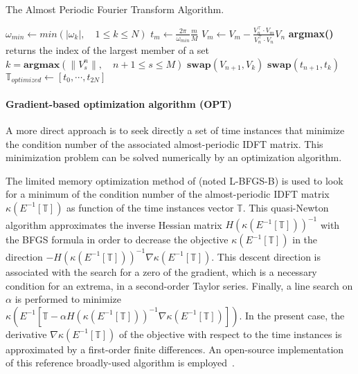 \begin{algorithm}[htb]
\caption{The Almost Periodic Fourier Transform Algorithm.}
\label{alg:algo_APFT}
\begin{algorithmic}
\STATE $\omega_{min} \leftarrow min \left( |\omega_k |,\quad 1 \leqslant k \leqslant N \right)$
    \STATE $t_m \leftarrow \displaystyle\frac{2\pi}{\omega_{min}}\frac{m}{M}$
\ENDFOR
{}
  \STATE $ V_{m} \leftarrow V_{m} - \displaystyle\frac{V_{n}^\top \cdot V_{m}}{V_{n}^\top \cdot V_{n}} V_{n}$
   \ENDFOR
   \STATE \textbf{argmax()} returns the index of the largest member of a set
   \STATE $k=\textbf{argmax} \left( \| V_s^n \|,\quad n+1\leqslant s \leqslant M\right) $
   \STATE $\textbf{swap}(V_{n+1},V_{k})$
   \STATE $\textbf{swap}(t_{n+1},t_{k})$
\ENDFOR
\STATE $\mathbb{T}_{optimized} \leftarrow [t_0, \cdots, t_{2N}]$
\end{algorithmic}
\end{algorithm}

\paragraph{Gradient-based optimization algorithm (OPT)}
A more direct approach is to seek directly a set of time instances
that minimize the condition number of the associated almost-periodic IDFT matrix. 
This minimization problem can be solved numerically by an optimization algorithm.

The limited memory optimization method of
\citet{Byrd1995} (noted L-BFGS-B) is
used to look for a minimum of the condition number of the
almost-periodic IDFT matrix $\kappa \left(E^{-1} \left[\mathbb{T} \right]
\right)$ as function of the time instances vector $\mathbb{T}$. This
quasi-Newton algorithm approximates the inverse Hessian matrix
$H(\kappa \left(E^{-1} \left[\mathbb{T} \right] \right))^{-1}$ with the
BFGS formula in order to decrease the objective $\kappa \left(E^{-1}
  \left[\mathbb{T} \right] \right)$ in the direction $-H(\kappa
\left(E^{-1} \left[\mathbb{T} \right] \right))^{-1}\nabla \kappa \left(E^{-1}
  \left[\mathbb{T} \right] \right)$.  This descent direction is
associated with the search for a zero of the gradient, which is a
necessary condition for an extrema, in a second-order Taylor series.
Finally, a line search on $\alpha$ is performed to minimize $\kappa
\left(E^{-1} \left[\mathbb{T} - \alpha H(\kappa \left(E^{-1} \left[\mathbb{T}
      \right] \right))^{-1} \nabla \kappa \left(E^{-1} \left[\mathbb{T}
      \right] \right) \right] \right)$.  In the present case, the
derivative $\nabla \kappa \left(E^{-1} \left[\mathbb{T} \right] \right)$ of
the objective with respect to the time instances is approximated by
a first-order finite differences.  An open-source implementation of this
reference broadly-used algorithm is
employed~\cite{Nocedal1980}.

